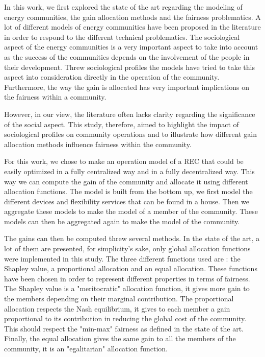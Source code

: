 In this work, we first explored the state of the art regarding the modeling of energy communities, the gain allocation methods and the fairness problematics. A lot of different models of energy communities have been proposed in the literature in order to respond to the different technical problematics. The sociological aspect of the energy communities is a very important aspect to take into account as the success of the communities depends on the involvement of the people in their development. Threw sociological profiles the models have tried to take this aspect into consideration directly in the operation of the community. Furthermore, the way the gain is allocated has very important implications on the fairness within a community. 

However, in our view, the literature often lacks clarity regarding the significance of the social aspect. This study, therefore, aimed to highlight the impact of sociological profiles on community operations and to illustrate how different gain allocation methods influence fairness within the community.

For this work, we chose to make an operation model of a REC that could be easily optimized in a fully centralized way and in a fully decentralized way. This way we can compute the gain of the community and allocate it using different allocation functions. The model is built from the bottom up, we first model the different devices and flexibility services that can be found in a house. Then we aggregate these models to make the model of a member of the community. These models can then be aggregated again to make the model of the community. 

The gains can then be computed threw several methods. In the state of the art, a lot of them are presented, for simplicity's sake, only global allocation functions were implemented in this study. The three different functions used are : the Shapley value, a proportional allocation and an equal allocation. These functions have been chosen in order to represent different properties in terms of fairness. The Shapley value is a "meritocratic" allocation function, it gives more gain to the members depending on their marginal contribution. The proportional allocation respects the Nash equilibrium, it gives to each member a gain proportional to its contribution in reducing the global cost of the community. This should respect the "min-max" fairness as defined in the state of the art. Finally, the equal allocation gives the same gain to all the members of the community, it is an "egalitarian" allocation function.

